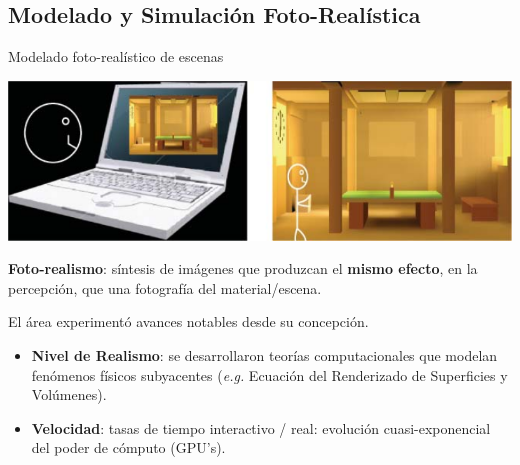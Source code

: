\documentclass[spanish,unknownkeysallowed]{beamer}
\begin{document}
\subsection{Modelado y Simulación Foto-Realística}
\begin{frame}{Modelado foto-realístico de escenas}



\centerline{\includegraphics[scale = 0.25]{../figures/fotorealismo}}

\textbf{Foto-realismo}: síntesis de imágenes que produzcan el \textbf{mismo efecto}, en la percepción, que una fotografía del material/escena.

\vspace{0.2cm}

El área experimentó avances notables desde su concepción.
\begin{block}{}
\begin{itemize}
\item \textbf{Nivel de Realismo}: se desarrollaron teorías computacionales que modelan fenómenos físicos subyacentes ({\it e.g.} Ecuación del Renderizado de Superficies y Volúmenes).
\item \textbf{Velocidad}: tasas de tiempo interactivo / real: evolución cuasi-exponencial del poder de cómputo (GPU's).
\end{itemize}
\end{block}

\end{frame}
\end{document}
